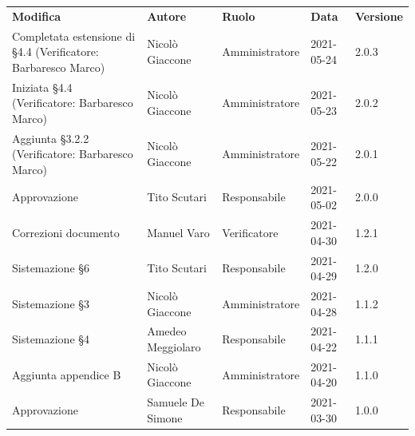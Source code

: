 \documentclass[a4paper]{article}
\begin{document}
\begin{center}
    \begin{table}[h!]
        \centering
        \renewcommand{\arraystretch}{1.8}
        \begin{tabular}{p{160px} p{90px} p{70px} p{55px} p{45px}}
            \rowcolor{logo!70} \textbf{Modifica}                                       & \textbf{Autore}   & \textbf{Ruolo} & \textbf{Data} & \textbf{Versione} \\
            Completata estensione di \S 4.4   \newline(Verificatore: Barbaresco Marco) & Nicolò Giaccone   & Amministratore & 2021-05-24    & 2.0.3             \\
            Iniziata \S 4.4   \newline(Verificatore: Barbaresco Marco)                 & Nicolò Giaccone   & Amministratore & 2021-05-23    & 2.0.2             \\
            Aggiunta \S 3.2.2 \newline(Verificatore: Barbaresco Marco)                 & Nicolò Giaccone   & Amministratore & 2021-05-22    & 2.0.1             \\
            Approvazione                                                               & Tito Scutari      & Responsabile   & 2021-05-02    & 2.0.0             \\
            Correzioni documento                                                       & Manuel Varo       & Verificatore   & 2021-04-30    & 1.2.1             \\
            Sistemazione \S 6                                                          & Tito Scutari      & Responsabile   & 2021-04-29    & 1.2.0             \\
            Sistemazione \S 3                                                          & Nicolò Giaccone   & Amministratore & 2021-04-28    & 1.1.2             \\
            Sistemazione \S 4                                                          & Amedeo Meggiolaro & Responsabile   & 2021-04-22    & 1.1.1             \\
            Aggiunta appendice B                                                       & Nicolò Giaccone   & Amministratore & 2021-04-20    & 1.1.0             \\
            Approvazione                                                               & Samuele De Simone & Responsabile   & 2021-03-30    & 1.0.0             \\

\end{tabular}
\end{table}
\end{center}
\end{document}

